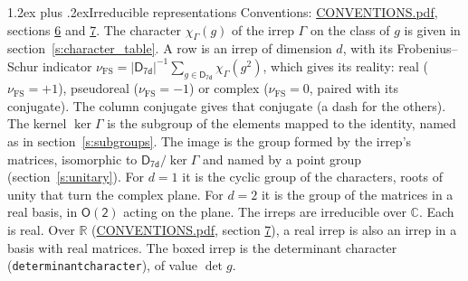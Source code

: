 \documentclass[10pt,a4paper]{article}
\makeatletter
\renewcommand\section{\@startsection{section}{1}{\z@}{-3ex plus -1ex minus -.2ex}%
  {1.2ex plus .2ex}{\normalfont\large\sffamily\bfseries\color{parttitle}}}
\numberwithin{equation}{section}
\newcommand{\grp}[1]{\mathsf{#1}}
\newcommand{\irchar}[1]{\chi_{#1}}
\newcommand{\fsind}{\nu_{\mathrm{FS}}}
\makeatother
\begin{document}
\section{Irreducible representations}\label{s:irreps}
Conventions: \href{../../CONVENTIONS.pdf}{CONVENTIONS.pdf}, sections \href{../../CONVENTIONS.pdf\#conv.6}{6} and \href{../../CONVENTIONS.pdf\#conv.7}{7}.
\leavevmode\label{n:function.character}\label{n:irrep.Gamma}The character $\irchar{\Gamma}(g)$ of the irrep $\Gamma$ on the class of $g$ is given in section~\ref{s:character_table}.
\leavevmode\label{n:index.dimension}\label{n:index.frobenius}\label{n:head.irrep}\label{n:head.reality}A row is an irrep of dimension $d$, with its Frobenius--Schur indicator $\fsind = |\grp{D_{7d}}|^{-1}\allowbreak\sum_{g\in\grp{D_{7d}}}\irchar{\Gamma}(g^2)$, which gives its reality: real ($\fsind = +1$), pseudoreal ($\fsind = -1$) or complex ($\fsind = 0$, paired with its conjugate). \label{n:head.conjugate}The column conjugate gives that conjugate (a dash for the others). \label{n:head.kernel}The kernel $\ker\Gamma$ is the subgroup of the elements mapped to the identity, named as in section~\ref{s:subgroups}. \label{n:head.image}The image is the group formed by the irrep's matrices, isomorphic to $\grp{D_{7d}}/\ker\Gamma$ and named by a point group (section~\ref{s:unitary}). For $d = 1$ it is the cyclic group of the characters, roots of unity that turn the complex plane. For $d = 2$ it is the group of the matrices in a real basis, in $\grp{O(2)}$ acting on the plane. The irreps are irreducible over $\mathbb{C}$. Each is real. Over $\mathbb{R}$ (\href{../../CONVENTIONS.pdf}{CONVENTIONS.pdf}, section \href{../../CONVENTIONS.pdf\#conv.7}{7}), a real irrep is also an irrep in a basis with real matrices. \label{n:mark.determinant}The boxed irrep is the determinant character (\texttt{determinantcharacter}), of value $\det g$.
\setlength{\emergencystretch}{2em}\par\setlength{\emergencystretch}{0pt}
\end{document}
